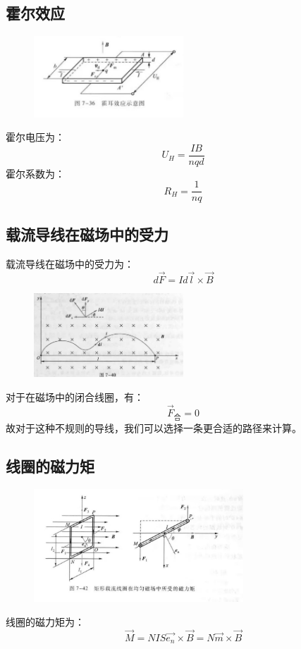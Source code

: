 \documentclass{ctexart}
\begin{document}
\subsection{霍尔效应}
\begin{figure}[H]
    \centering
    \includegraphics[width=0.5\textwidth]{img/7-36.jpg}
\end{figure}
霍尔电压为：
$$
    U_H = \frac{IB}{nqd}
$$
霍尔系数为：
$$
    R_H = \frac{1}{nq}
$$
\subsection{载流导线在磁场中的受力}
载流导线在磁场中的受力为：
$$
    d\vec{F} = I d\vec{l} \times \vec{B}
$$
\begin{figure}[H]
    \centering
    \includegraphics[width=0.5\textwidth]{img/7-40.jpg}
\end{figure}
对于在磁场中的闭合线圈，有：
$$
    \vec{F}_{\text{合}} = 0
$$
故对于这种不规则的导线，我们可以选择一条更合适的路径来计算。
\subsection{线圈的磁力矩}
\begin{figure}[H]
    \centering
    \includegraphics[width=0.7\textwidth]{img/7-42.jpg}
\end{figure}
线圈的磁力矩为：
$$
    \vec{M} =NIS\vec{e_n}\times \vec{B}=N \vec{m} \times \vec{B}
$$
\end{document}
